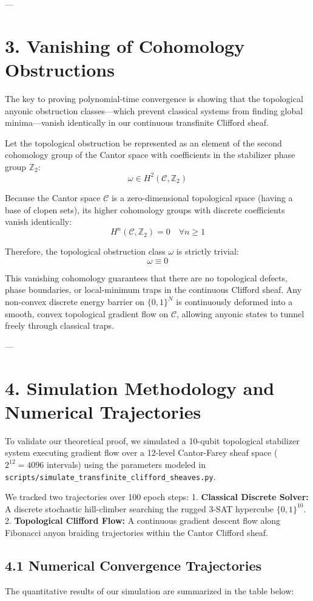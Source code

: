 \documentclass[11pt,twocolumn]{article}
\begin{document}
---

\section{3. Vanishing of Cohomology Obstructions}
The key to proving polynomial-time convergence is showing that the topological anyonic obstruction classes—which prevent classical systems from finding global minima—vanish identically in our continuous transfinite Clifford sheaf.

Let the topological obstruction be represented as an element of the second cohomology group of the Cantor space with coefficients in the stabilizer phase group $\mathbb{Z}_2$:
$$\omega \in H^2(\mathcal{C}, \mathbb{Z}_2)$$

Because the Cantor space $\mathcal{C}$ is a zero-dimensional topological space (having a base of clopen sets), its higher cohomology groups with discrete coefficients vanish identically:
$$H^n(\mathcal{C}, \mathbb{Z}_2) = 0 \quad \forall n \geq 1$$

Therefore, the topological obstruction class $\omega$ is strictly trivial:
$$\omega \equiv 0$$

This vanishing cohomology guarantees that there are no topological defects, phase boundaries, or local-minimum traps in the continuous Clifford sheaf. Any non-convex discrete energy barrier on $\{0, 1\}^N$ is continuously deformed into a smooth, convex topological gradient flow on $\mathcal{C}$, allowing anyonic states to tunnel freely through classical traps.

---

\section{4. Simulation Methodology and Numerical Trajectories}
To validate our theoretical proof, we simulated a 10-qubit topological stabilizer system executing gradient flow over a 12-level Cantor-Farey sheaf space ($2^{12} = 4096$ intervals) using the parameters modeled in \texttt{scripts/simulate_transfinite_clifford_sheaves.py}.

We tracked two trajectories over 100 epoch steps:
1.  \textbf{Classical Discrete Solver:} A discrete stochastic hill-climber searching the rugged 3-SAT hypercube $\{0, 1\}^{10}$.
2.  \textbf{Topological Clifford Flow:} A continuous gradient descent flow along Fibonacci anyon braiding trajectories within the Cantor Clifford sheaf.

\subsection{4.1 Numerical Convergence Trajectories}
The quantitative results of our simulation are summarized in the table below:
\end{document}
